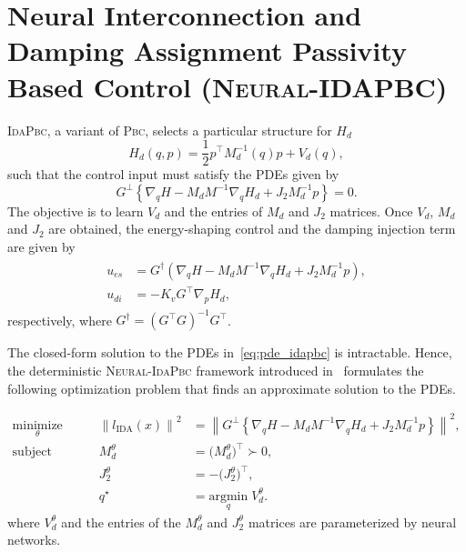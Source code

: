 % 
\section{Neural Interconnection and Damping Assignment Passivity Based Control (\textsc{Neural-IDAPBC})}

\textsc{IdaPbc}, a variant of \textsc{Pbc}, selects a particular structure for
$H_d$ 
\begin{equation}
  H_d(q, p) = \frac{1}{2} p^\top M_d^{-1}(q) p + V_d(q),
  \label{eq:idapbc_desired_hamiltonian}
\end{equation}
such that the control input must satisfy the PDEs given by 
\begin{equation}
  G^\perp \left\{ \nabla_qH - M_dM^{-1} \nabla_qH_d + J_2M_d^{-1}p \right\} = 0.
  \label{eq:pde_idapbc}
\end{equation}
The objective is to learn $V_d$ and the entries of $M_d$ and $J_2$ matrices.
Once $V_d$, $M_d$ and $J_2$ are obtained, the energy-shaping control and the
damping injection term are given by
%
\begin{align}
  \begin{split}
  u_{es} &= G^{\dagger} \left(\nabla_qH - M_dM^{-1} \nabla_qH_d + J_2M_d^{-1}p\right), \\
  u_{di} &= -K_v G^\top \nabla_p H_d,
  \end{split}
  \label{eq:idapbc_ues}
\end{align}
%
respectively, where $G^{\dagger} = \left(G^\top G\right)^{-1} G^\top$.

The closed-form solution to the PDEs in~\eqref{eq:pde_idapbc} is intractable.
Hence, the deterministic \textsc{Neural-IdaPbc} framework introduced
in~\cite{neuralidapbc} formulates the following optimization problem that finds
an approximate solution to the PDEs.

\begin{equation}
  \begin{aligned}
      \underset{\theta }{\textrm{minimize}} 
      &&\quad \left\| l_{\textrm{IDA}} (x) \right\|^2 &= \left\| G^\perp \left\{ \nabla_qH - M_dM^{-1} \nabla_qH_d + J_2M_d^{-1}p \right\} \right\|^2, \\
      \textrm{subject to} 
      &&\quad M_d^\theta &= \big( M_d^\theta \big)^\top \succ 0, \\
      &&\quad J_2^\theta &= -\big( J_2^\theta \big)^\top, \\
      &&\quad q^\star &= \underset{q}{\textrm{argmin}}\; V_d^\theta.
  \end{aligned}    
  \label{eq:idapbc_finite_optim}%
\end{equation}
where $V^\theta_d$ and the entries of the $M^\theta_d$ and $J^\theta_2$ matrices
are parameterized by neural networks. 

